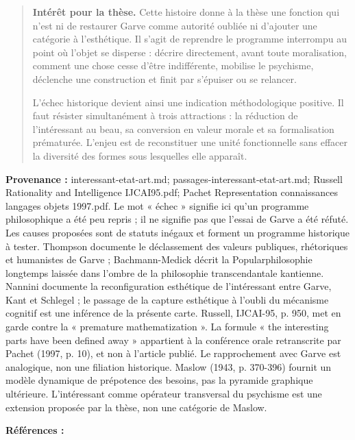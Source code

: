\documentclass[10pt,a4paper]{article}
\begin{document}
\begin{quote}
\textbf{Intérêt pour la thèse.} Cette histoire donne à la thèse une fonction qui n'est ni de restaurer Garve comme autorité oubliée ni d'ajouter une catégorie à l'esthétique. Il s'agit de reprendre le programme interrompu au point où l'objet se disperse : décrire directement, avant toute moralisation, comment une chose cesse d'être indifférente, mobilise le psychisme, déclenche une construction et finit par s'épuiser ou se relancer.

L'échec historique devient ainsi une indication méthodologique positive. Il faut résister simultanément à trois attractions : la réduction de l'intéressant au beau, sa conversion en valeur morale et sa formalisation prématurée. L'enjeu est de reconstituer une unité fonctionnelle sans effacer la diversité des formes sous lesquelles elle apparaît.
\end{quote}
{\footnotesize\color{metadata}\textbf{Provenance :} interessant-etat-art.md; passages-interessant-etat-art.md; Russell Rationality and Intelligence IJCAI95.pdf; Pachet Representation connaissances langages objets 1997.pdf. Le mot « échec » signifie ici qu'un programme philosophique a été peu repris ; il ne signifie pas que l'essai de Garve a été réfuté. Les causes proposées sont de statuts inégaux et forment un programme historique à tester. Thompson documente le déclassement des valeurs publiques, rhétoriques et humanistes de Garve ; Bachmann-Medick décrit la Popularphilosophie longtemps laissée dans l'ombre de la philosophie transcendantale kantienne. Nannini documente la reconfiguration esthétique de l'intéressant entre Garve, Kant et Schlegel ; le passage de la capture esthétique à l'oubli du mécanisme cognitif est une inférence de la présente carte. Russell, IJCAI-95, p. 950, met en garde contre la « premature mathematization ». La formule « the interesting parts have been defined away » appartient à la conférence orale retranscrite par Pachet (1997, p. 10), et non à l'article publié. Le rapprochement avec Garve est analogique, non une filiation historique. Maslow (1943, p. 370-396) fournit un modèle dynamique de prépotence des besoins, pas la pyramide graphique ultérieure. L'intéressant comme opérateur transversal du psychisme est une extension proposée par la thèse, non une catégorie de Maslow.\par}
{\footnotesize\color{metadata}\textbf{Références :} \parencite{garve1779interessirende,nannini2018garve,nannini2018interesting,bachmannmedick2008anziehungskraft,thompson2018garve,kant1993juger,schlegel2001study,ngai2008merely,maslow1943motivation,bridgman2019maslow,russell1995rationality,russell1995awardlecture,pachet1997representation}\par}
\end{document}
